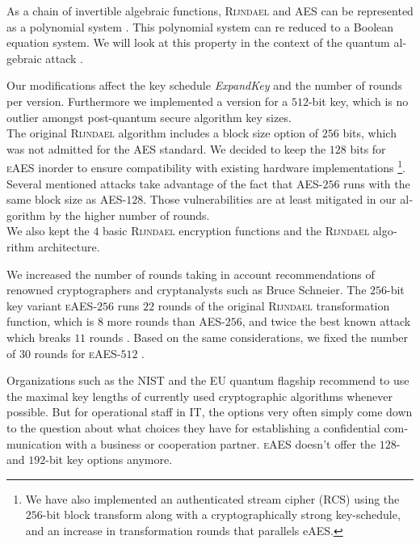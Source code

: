 \documentclass[a4paper,11pt]{article}
\begin{document}
\begin{otherlanguage}{english}
\begin{multicols}{2}
\vspace{0.2cm}
\noindent
As a chain of invertible algebraic functions, \textsc{Rijndael} and \textsc{AES} can be represented as a polynomial system \cite{CCI}. This polynomial system can re reduced to a Boolean equation system. We will look at this property in the context of the quantum algebraic attack \cite{QAA}.

\noindent
Our modifications affect the key schedule \textit{ExpandKey} and the number of rounds per version. Furthermore we implemented a version for a $512$-bit key, which is no outlier amongst post-quantum secure algorithm key sizes. \\

\noindent
The original \textsc{Rijndael} algorithm includes a block size option of $256$ bits, which was not admitted for the \textsc{AES} standard. We decided to keep the $128$ bits for \textsc{eAES} inorder to ensure compatibility with existing hardware implementations \footnote{We have also implemented an authenticated stream cipher (\textsc{RCS}) using the $256$-bit block transform along with a cryptographically strong key-schedule, and an increase in transformation rounds that parallels eAES.}. Several mentioned attacks take advantage of the fact that \textsc{AES}-$256$ runs with the same block size as \textsc{AES}-$128$. Those vulnerabilities are at least mitigated in our algorithm by the higher number of rounds. \\

\noindent
We also kept the $4$ basic \textsc{Rijndael} encryption functions and the \textsc{Rijndael} algorithm architecture.

\noindent
We increased the number of rounds taking in account recommendations of renowned cryptographers and cryptanalysts such as Bruce Schneier. The $256$-bit key variant \textsc{eAES}-$256$ runs $22$ rounds of the original \textsc{Rijndael} transformation function, which is $8$ more rounds than \textsc{AES}-$256$, and twice the best known attack which breaks $11$ rounds \cite{WEI}. Based on the same consi\-derations, we fixed the number of $30$ rounds for \textsc{eAES}-$512$ . 

\noindent
Organizations such as the NIST and the EU quantum flagship \cite{KPN} recommend to use the maximal key lengths of currently used cryptographic algorithms whenever possible. But for operational staff in IT, the options very often simply come down to the question about what choices they have for establishing a confidential communication with a business or cooperation partner. \textsc{eAES} doesn't offer the $128$- and $192$-bit key options anymore.


\end{multicols}
\end{otherlanguage}
\end{document}
